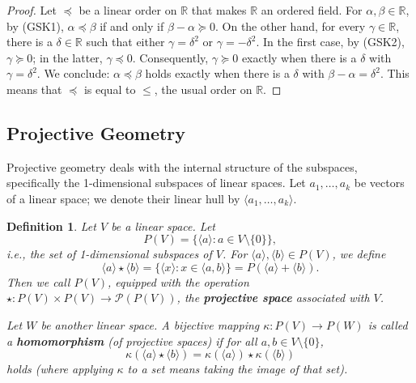 \documentclass[11pt,a4paper]{article}
\newtheorem{definition}[theorem]{Definition}
\begin{document}
\begin{proof}
Let $\preceq$ be a linear order on $\mathbb{R}$ that makes $\mathbb{R}$ an ordered field. For $\alpha, \beta \in \mathbb{R}$, by (GSK1), $\alpha \preceq \beta$ if and only if $\beta - \alpha \succeq 0$. On the other hand, for every $\gamma \in \mathbb{R}$, there is a $\delta \in \mathbb{R}$ such that either $\gamma = \delta^2$ or $\gamma = -\delta^2$. In the first case, by (GSK2), $\gamma \succeq 0$; in the latter, $\gamma \preceq 0$. Consequently, $\gamma \succeq 0$ exactly when there is a $\delta$ with $\gamma = \delta^2$.
We conclude: $\alpha \preceq \beta$ holds exactly when there is a $\delta$ with $\beta - \alpha = \delta^2$. This means that $\preceq$ is equal to $\le$, the usual order on $\mathbb{R}$.
\end{proof}

\subsection{Projective Geometry}

Projective geometry deals with the internal structure of the subspaces, specifically the 1-dimensional subspaces of linear spaces. Let $a_1, \dots, a_k$ be vectors of a linear space; we denote their linear hull by $\langle a_1, \dots, a_k \rangle$.

\begin{definition} \label{def:projective_space}
Let $V$ be a linear space. Let
\[ P(V) = \{ \langle a \rangle : a \in V \setminus \{0\} \}, \]
i.e., the set of 1-dimensional subspaces of $V$. For $\langle a \rangle, \langle b \rangle \in P(V)$, we define
\[ \langle a \rangle \star \langle b \rangle = \{ \langle x \rangle : x \in \langle a, b \rangle \} = P(\langle a \rangle + \langle b \rangle). \]
Then we call $P(V)$, equipped with the operation $\star: P(V) \times P(V) \to \mathcal{P}(P(V))$, the \textbf{projective space} associated with $V$.

Let $W$ be another linear space. A bijective mapping $\kappa: P(V) \to P(W)$ is called a \textbf{homomorphism} (of projective spaces) if for all $a, b \in V \setminus \{0\}$,
\begin{equation} \label{eq:proj_homo}
    \kappa(\langle a \rangle \star \langle b \rangle) = \kappa(\langle a \rangle) \star \kappa(\langle b \rangle)
\end{equation}
holds (where applying $\kappa$ to a set means taking the image of that set).
\end{definition}
\end{document}
